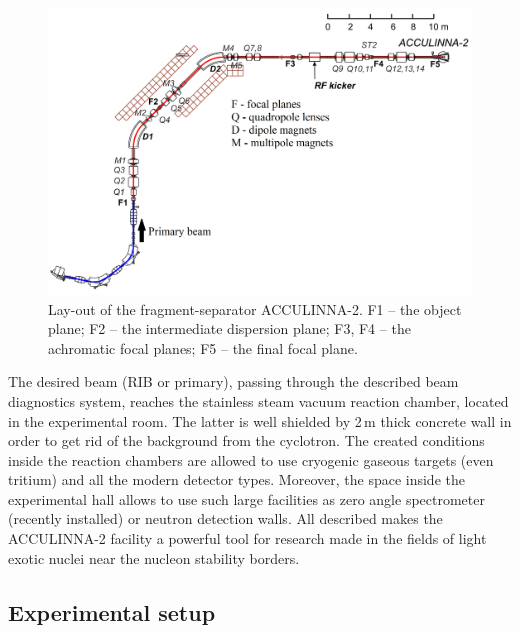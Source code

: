 \begin{figure}[t]
	\begin{center}
		\includegraphics[width=1\textwidth]{figures/acculinna2.png}
	\end{center}
	\caption{Lay-out of the fragment-separator ACCULINNA-2. F1 – the object plane; F2 – the intermediate dispersion plane; F3, F4 – the achromatic focal planes; F5 – the final focal plane.}
	\label{fig:acculinna2_scheme}
\end{figure}

The desired beam (RIB or primary), passing through the described beam diagnostics system, reaches the stainless steam vacuum reaction chamber, located in the experimental room.
The latter is well shielded by 2\,m thick concrete wall in order to get rid of the background from the cyclotron.
The created conditions inside the reaction chambers are allowed to use cryogenic gaseous targets (even tritium) and all the modern detector types.
Moreover, the space inside the experimental hall allows to use such large facilities as zero angle spectrometer (recently installed) or neutron detection walls.
All described makes the ACCULINNA-2 facility a powerful tool for research made in the fields of light exotic nuclei near the nucleon stability borders.

\subsection{Experimental setup}

